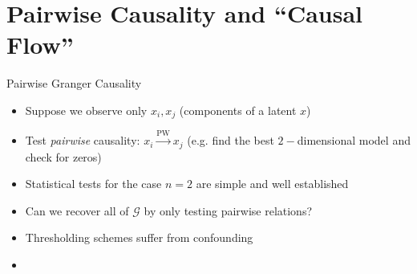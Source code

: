 \documentclass{beamer} %
\def\pwgc{\overset{\text{PW}}{\rightarrow}}  %
\def\gcg{\mathcal{G}}  %
\begin{document}
\section{Pairwise Causality and ``Causal Flow''}
\begin{frame}{Pairwise Granger Causality}
  \begin{itemize}
    \item{Suppose we observe only $x_i, x_j$ (components of a latent $x$)}\pause
    \item{Test \textit{pairwise} causality: $x_i \pwgc x_j$ (e.g. find
        the best $2-$dimensional model and check for zeros)}\pause
    \item{Statistical tests for the case $n = 2$ are simple and well established}\pause
    \item{Can we recover all of $\gcg$ by only testing pairwise relations?}\pause
    \item{Thresholding schemes suffer from confounding}\pause
    \item{}
  \end{itemize}
\end{frame}
\end{document}
